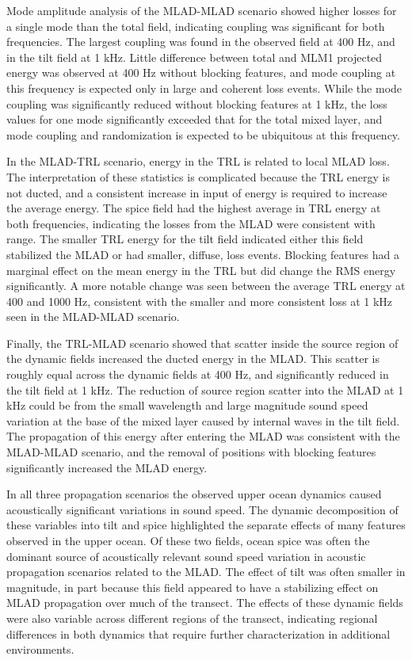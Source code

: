 \documentclass[preprint,NumberedRefs]{JASA}
\begin{document}
Mode amplitude analysis of the MLAD-MLAD scenario showed higher losses for a single mode than the total field, indicating coupling was significant for both frequencies. The largest coupling was found in the observed field at 400 Hz, and in the tilt field at 1 kHz. Little difference between total and MLM1 projected energy was observed at 400 Hz without blocking features, and mode coupling at this frequency is expected only in large and coherent loss events. While the mode coupling was significantly reduced without blocking features at 1 kHz, the loss values for one mode significantly exceeded that for the total mixed layer, and mode coupling and randomization is expected to be ubiquitous at this frequency.

In the MLAD-TRL scenario, energy in the TRL is related to local MLAD loss. The interpretation of these statistics is complicated because the TRL energy is not ducted, and a consistent increase in input of energy is required to increase the average energy. The spice field had the highest average in TRL energy at both frequencies, indicating the losses from the MLAD were consistent with range. The smaller TRL energy for the tilt field indicated either this field stabilized the MLAD or had smaller, diffuse, loss events. Blocking features had a marginal effect on the mean energy in the TRL but did change the RMS energy significantly. A more notable change was seen between the average TRL energy at 400 and 1000 Hz, consistent with the smaller and more consistent loss at 1 kHz seen in the MLAD-MLAD scenario.

Finally, the TRL-MLAD scenario showed that scatter inside the source region of the dynamic fields increased the ducted energy in the MLAD. This scatter is roughly equal across the dynamic fields at 400 Hz, and significantly reduced in the tilt field at 1 kHz. The reduction of source region scatter into the MLAD at 1 kHz could be from the small wavelength and large magnitude sound speed variation at the base of the mixed layer caused by internal waves in the tilt field. The propagation of this energy after entering the MLAD was consistent with the MLAD-MLAD scenario, and the removal of positions with blocking features significantly increased the MLAD energy.

In all three propagation scenarios the observed upper ocean dynamics caused acoustically significant variations in sound speed. The dynamic decomposition of these variables into tilt and spice highlighted the separate effects of many features observed in the upper ocean. Of these two fields, ocean spice was often the dominant source of acoustically relevant sound speed variation in acoustic propagation scenarios related to the MLAD. The effect of tilt was often smaller in magnitude, in part because this field appeared to have a stabilizing effect on MLAD propagation over much of the transect. The effects of these dynamic fields were also variable across different regions of the transect, indicating regional differences in both dynamics that require further characterization in additional environments.




\end{document}
